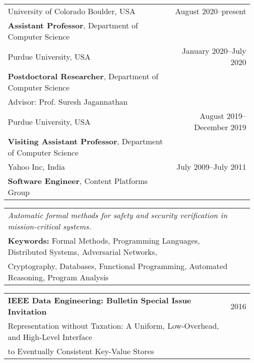 \documentclass{article}
\begin{document}
\begin{center}
  \begin{tabular}{ p{10cm}  r}
    University of Colorado Boulder, USA  & August 2020--present \\
    {\bf Assistant Professor}, Department of Computer Science &\\[12pt]

    Purdue University, USA & January 2020--July 2020 \\
    {\bf Postdoctoral Researcher}, Department of Computer Science &\\
    Advisor: Prof. Suresh Jagannathan &\\[12pt]

    Purdue University, USA & August 2019--December 2019 \\
    {\bf Visiting Assistant Professor}, Department of Computer Science &\\[12pt]

    Yahoo Inc, India & July 2009--July 2011 \\
    {\bf Software Engineer}, Content Platforms Group &\\[12pt]
    \end{tabular}
  \end{center}


\begin{center}
  \begin{tabular}{ l  r }
    \emph{Automatic formal methods for safety and security verification in mission-critical systems.} & \\ [5pt]
{\bf Keywords:} Formal Methods, Programming Languages, Distributed Systems,
Adversarial Networks, &\\
Cryptography, Databases, Functional Programming, Automated Reasoning, Program Analysis&\\ 
\end{tabular}
\end{center}


\vspace{1em}
\begin{center}
  \begin{tabular}{ p{15cm}  r }
    {\bf IEEE Data Engineering: Bulletin Special Issue Invitation} & 2016\\ [3pt]
    \hspace{2em} Representation without Taxation: A Uniform, Low-Overhead,
    and High-Level Interface & \\
    \hspace{2em} to Eventually Consistent Key-Value Stores   & \\[6pt]
    \end{tabular}
\end{center}
\end{document}
